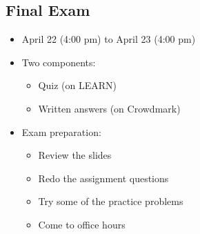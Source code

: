 \documentclass[12pt,titlepage]{article}
\begin{document}
\subsection{Final Exam}
\begin{itemize}
	\item April 22 (4:00 pm) to April 23 (4:00 pm)
	\item Two components:\begin{itemize}
		\item Quiz (on LEARN)
		\item Written answers (on Crowdmark)
	\end{itemize}
	\item Exam preparation:\begin{itemize}
		\item Review the slides
		\item Redo the assignment questions
		\item Try some of the practice problems
		\item Come to office hours
	\end{itemize}
\end{itemize}
\end{document}
